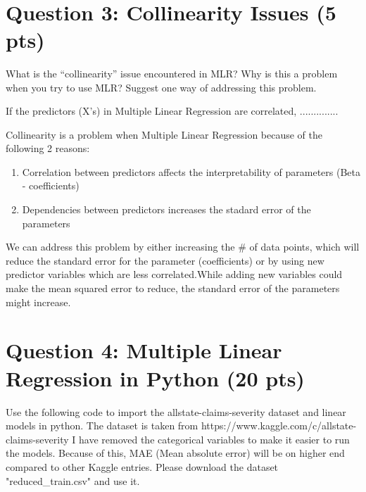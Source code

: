 \documentclass[11pt]{article}
\providecommand{\tightlist}{%
      \setlength{\itemsep}{0pt}\setlength{\parskip}{0pt}}
\begin{document}
    \begin{center}
    \end{center}
    { \hspace*{\fill} \\}
    

    \section{Question 3: Collinearity Issues (5
pts)}\label{question-3-collinearity-issues-5-pts}

What is the ``collinearity'' issue encountered in MLR? Why is this a
problem when you try to use MLR? Suggest one way of addressing this
problem.

    If the predictors (X's) in Multiple Linear Regression are correlated,
..............

Collinearity is a problem when Multiple Linear Regression because of the
following 2 reasons:

\begin{enumerate}
\def\labelenumi{\arabic{enumi}.}
\tightlist
\item
  Correlation between predictors affects the interpretability of
  parameters (Beta - coefficients)
\item
  Dependencies between predictors increases the stadard error of the
  parameters
\end{enumerate}

We can address this problem by either increasing the \# of data points,
which will reduce the standard error for the parameter (coefficients) or
by using new predictor variables which are less correlated.While adding
new variables could make the mean squared error to reduce, the standard
error of the parameters might increase.

    \section{Question 4: Multiple Linear Regression in Python (20
pts)}\label{question-4-multiple-linear-regression-in-python-20-pts}

Use the following code to import the allstate-claims-severity dataset
and linear models in python. The dataset is taken from
https://www.kaggle.com/c/allstate-claims-severity I have removed the
categorical variables to make it easier to run the models. Because of
this, MAE (Mean absolute error) will be on higher end compared to other
Kaggle entries. Please download the dataset "reduced\_train.csv" and use
it.
\end{document}
